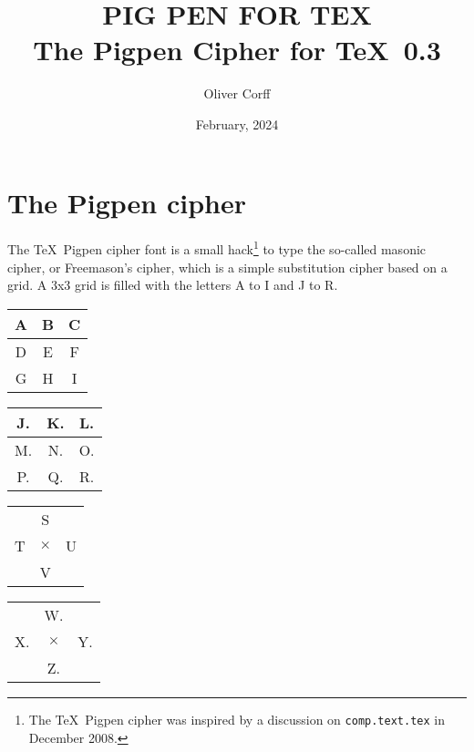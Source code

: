 \documentclass[a4paper]{article}
\title{{\pigpenfont PIG PEN FOR TEX}\\[0.5cm]
	The Pigpen Cipher for \TeX\ 0.3}
\author{Oliver Corff}
\date{February, 2024}
\begin{document}
\maketitle


\section{The Pigpen cipher}

The \TeX\ Pigpen cipher font is a small hack\footnote{%
	The \TeX\ Pigpen cipher was inspired by a discussion on
	\texttt{comp.text.tex} in December 2008.} 
to type the so-called masonic cipher, or Freemason's cipher,
which is a simple substitution cipher based on a grid. 
A 3x3 grid is filled with the letters A to I and J to R.
\begin{center}
\begin{minipage}[t]{3cm}%
\begin{tabular}{c|c|c}
	A&B&C\\
	\hline
	D&E&F\\
	\hline
	G&H&I\\
\end{tabular}\end{minipage}%
\begin{minipage}[t]{3cm}%
\begin{tabular}{c|c|c}
	J.&K.&L.\\
	\hline
	M.&N.&O.\\
	\hline
	P.&Q.&R.\\
\end{tabular}\end{minipage}
\begin{minipage}[t]{3cm}%
\begin{tabular}{ccc}
	 &S& \\
	T&$\times$&U\\
	 &V& \\
\end{tabular}\end{minipage}%
\begin{minipage}[t]{3cm}%
\begin{tabular}{ccc}
	 &W.& \\
	X.&$\times$&Y.\\
	 &Z.&\\
\end{tabular}\end{minipage}
\end{center}
\end{document}
